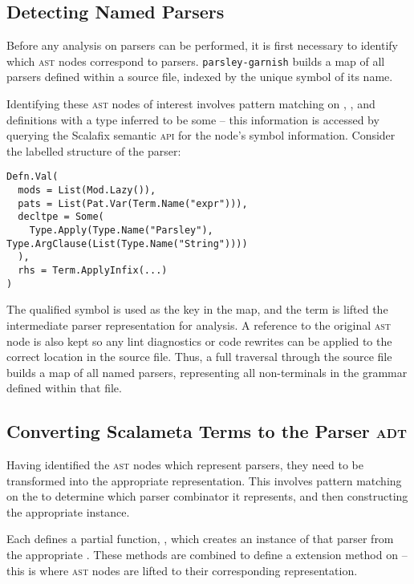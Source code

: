 \documentclass[../../main.tex]{subfiles}
\begin{document}
\subsection{Detecting Named Parsers}
Before any analysis on parsers can be performed, it is first necessary to identify which \textsc{ast} nodes correspond to parsers.
\texttt{parsley-garnish} builds a map of all parsers defined within a source file, indexed by the unique symbol of its name.

Identifying these \textsc{ast} nodes of interest involves pattern matching on , , and  definitions with a type inferred to be some  -- this information is accessed by querying the Scalafix semantic \textsc{api} for the node's symbol information.
Consider the labelled  structure of the  parser:
\begin{verbatim}
Defn.Val(
  mods = List(Mod.Lazy()),
  pats = List(Pat.Var(Term.Name("expr"))),
  decltpe = Some(
    Type.Apply(Type.Name("Parsley"), Type.ArgClause(List(Type.Name("String"))))
  ),
  rhs = Term.ApplyInfix(...)
)
\end{verbatim}
%
The qualified symbol  is used as the key in the map, and the  term is lifted the intermediate parser representation for analysis.
A reference to the original \textsc{ast} node is also kept so any lint diagnostics or code rewrites can be applied to the correct location in the source file.
Thus, a full traversal through the source file builds a map of all named parsers, representing all non-terminals in the grammar defined within that file.

\subsection{Converting Scalameta Terms to the Parser \textsc{adt}}
Having identified the \textsc{ast} nodes which represent parsers, they need to be transformed into the appropriate  representation.
This involves pattern matching on the  to determine which parser combinator it represents, and then constructing the appropriate  instance.

Each  defines a partial function, , which creates an instance of that parser from the appropriate .
These  methods are combined to define a  extension method on  -- this is where \textsc{ast} nodes are lifted to their corresponding  representation.
\end{document}
